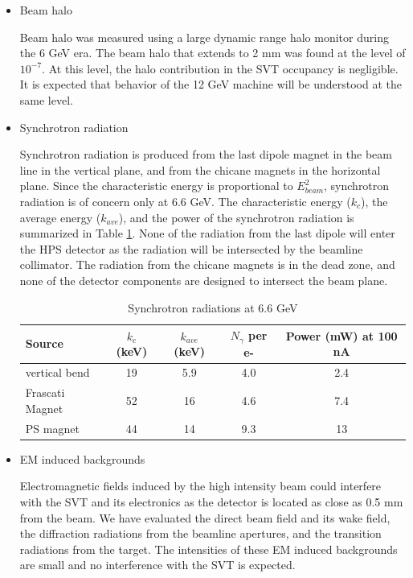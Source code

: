 \begin{itemize}
\item
Beam halo

Beam halo was measured using a large dynamic range halo monitor during the 6 GeV era. The beam halo 
that extends to 2 mm was found at the level of $10^{-7}$. At this level, the halo contribution in 
the SVT occupancy is negligible. It is expected that behavior of the 12 GeV machine will be
understood at the same level.

\item
Synchrotron radiation

Synchrotron radiation is produced from the last dipole magnet in the beam line in the vertical 
plane, and from the chicane magnets in the horizontal plane. Since the characteristic energy is 
proportional to $E_{beam}^2$, synchrotron radiation is of concern 
only at 6.6 GeV. The characteristic energy ($k_c$),
the average energy ($k_{ave}$), and the power of the synchrotron radiation is summarized in 
Table \ref{tab:sync}.
None of the radiation from the last dipole will enter the HPS detector as the radiation will be intersected 
by the beamline collimator. The radiation from the chicane magnets is in the dead zone, and
none of the detector components are designed to intersect the beam plane.   

\begin{table}[h]
\begin{center}
\begin{tabular}{|l|c|c|c|c|} \hline
  Source & $k_c$ (keV) & $k_{ave}$ (keV) & $N_\gamma$ per e- & Power (mW) at 100 nA \\ \hline
  vertical bend & 19 & 5.9 & 4.0 & 2.4 \\ \hline
  Frascati Magnet & 52 & 16 & 4.6 & 7.4 \\ \hline
  PS magnet   & 44 & 14 & 9.3 & 13 \\ \hline
\end{tabular}
\end{center}
\caption{\small{Synchrotron radiations at 6.6 GeV}}
\label{tab:sync}
\end{table}


\item
EM induced backgrounds

Electromagnetic fields induced by the high intensity beam could interfere with the SVT and its electronics
as the detector is located as close as 0.5 mm from the beam. We have evaluated the direct beam field and its wake 
field, the diffraction radiations from the beamline apertures, and the transition radiations from
the target. The intensities of these EM induced backgrounds are small and no interference with the SVT
is expected.
 
\end{itemize}

